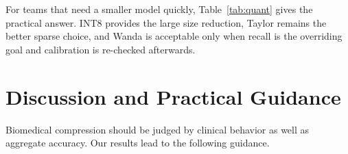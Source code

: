 \documentclass{article}
\begin{document}
\begin{table}[t]
\centering
\small
\caption{Selected deployment summary from the multi-seed personal quantization run. Quantization closely preserves dense behavior, but the pruning criterion still determines the downstream clinical tradeoff. We report size because it is the main deployment gain; latency depends on the backend and is discussed in the appendix.}
\label{tab:quant}
\end{table}

For teams that need a smaller model quickly, Table~\ref{tab:quant} gives the practical answer. INT8 provides the large size reduction, Taylor remains the better sparse choice, and Wanda is acceptable only when recall is the overriding goal and calibration is re-checked afterwards.

\section{Discussion and Practical Guidance}
Biomedical compression should be judged by clinical behavior as well as aggregate accuracy. Our results lead to the following guidance.
\end{document}
